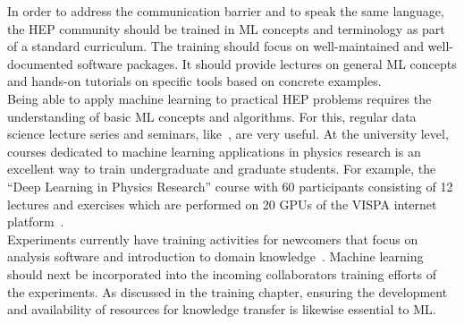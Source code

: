 In order to address the communication barrier and to speak the same language, the HEP community should be trained in ML concepts and terminology as part of a standard curriculum. The training should focus on well-maintained and well-documented software packages. It should provide lectures on general ML concepts and hands-on tutorials on specific tools based on concrete examples.\\

Being able to apply machine learning to practical HEP problems requires the understanding of basic ML concepts and algorithms. For this, regular data science lecture series and seminars, like~\cite{mlhep}, are very useful. At the university level, courses dedicated to machine learning applications in physics research is an excellent way to train undergraduate and graduate students. For example, the ``Deep Learning in Physics Research'' course with 60 participants consisting of 12 lectures and exercises which are performed on 20 GPUs of the VISPA internet platform~\cite{vispa}.\\ %

Experiments currently have training activities for newcomers that focus on analysis software and introduction to domain knowledge~\cite{2016chep.confE.334B}. Machine learning should next be incorporated into the incoming collaborators training efforts of the experiments.
As discussed in the training chapter, ensuring the development and availability of resources for knowledge transfer is likewise essential to ML.%


